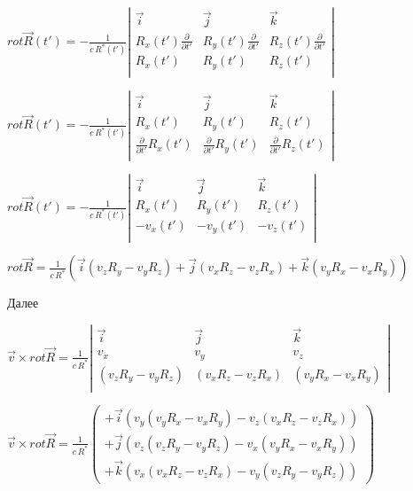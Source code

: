 \documentclass[11pt]{article}
\begin{document}
    \(rot \overrightarrow{R}\left(t'\right)=-\frac{1}{c\,{{R}^{*}}\left(t'\right)}\left|\begin{array}{ccc}  \vec i & \vec j & \vec k \\  R_x\left(t'\right)\frac{\partial}{\partial t'}  & R_y\left(t'\right)\frac{\partial}{\partial t'}  & R_z\left(t'\right)\frac{\partial}{\partial t'} \\  R_{x}\left(t'\right) & R_{y}\left(t'\right) & R_{z}\left(t'\right)\\ \end{array}\right|\)

    \(rot \overrightarrow{R}\left(t'\right)=-\frac{1}{c\,{{R}^{*}}\left(t'\right)}\left|\begin{array}{ccc}  \vec i & \vec j & \vec k \\  R_x\left(t'\right)  & R_y\left(t'\right)  & R_z\left(t'\right) \\  \frac{\partial}{\partial t'}R_{x}\left(t'\right)  & \frac{\partial}{\partial t'} R_{y}\left(t'\right)  & \frac{\partial}{\partial t'} R_{z}\left(t'\right)\\ \end{array}\right|\)

    \(rot \overrightarrow{R}\left(t'\right)=-\frac{1}{c\,{{R}^{*}}\left(t'\right)}\left|\begin{array}{ccc}  \vec i & \vec j & \vec k \\  R_x\left(t'\right)  & R_y\left(t'\right)  & R_z\left(t'\right) \\  -v_{x}\left(t'\right)  & -v_{y}\left(t'\right)  & -v_{z}\left(t'\right)\\ \end{array}\right|\)

    \(rot \overrightarrow{R}=\frac{1}{c\,{{R}^{*}}}\left(  \vec i \left(v_z R_y - v_y R_z\right) +  \vec j \left(v_x R_z - v_z R_x\right) +  \vec k \left(v_y R_x - v_x R_y\right)\right)\)

    Далее

\(\vec v \times rot \overrightarrow{R}=\frac{1}{c\,{{R}^{*}}}\left|\begin{array}{ccc}  \vec i & \vec j & \vec k \\  v_x  & v_y  & v_z \\  \left(v_z R_y - v_y R_z\right)  & \left(v_x R_z - v_z R_x\right)  & \left(v_y R_x - v_x R_y\right)\\ \end{array}\right|\)

    \(\vec v \times rot \overrightarrow{R}=\frac{1}{c\,{{R}^{*}}}\left(\begin{array}{c}  +\vec i \left( v_y \left(v_y R_x - v_x R_y\right) - v_z \left(v_x R_z - v_z R_x\right) \right) \\  +\vec j \left( v_z \left(v_z R_y - v_y R_z\right) - v_x \left(v_y R_x - v_x R_y\right) \right) \\  +\vec k \left( v_x \left(v_x R_z - v_z R_x\right) - v_y \left(v_z R_y - v_y R_z\right) \right) \end{array}\right)\)
\end{document}
